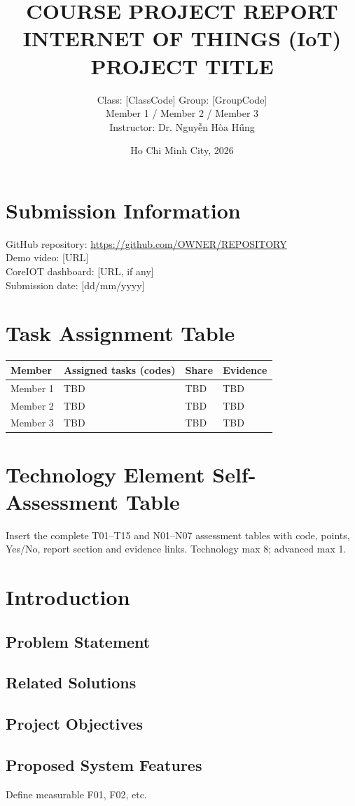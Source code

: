 \documentclass[12pt,a4paper]{report}
\title{COURSE PROJECT REPORT\\INTERNET OF THINGS (IoT)\\[1em]PROJECT TITLE}
\author{Class: [ClassCode] \quad Group: [GroupCode]\\ Member 1 / Member 2 / Member 3\\ Instructor: Dr. Nguy\~{\^e}n H\`oa H\H{u}ng}
\date{Ho Chi Minh City, 2026}
\begin{document}
\maketitle
\chapter*{Submission Information}
GitHub repository: \url{https://github.com/OWNER/REPOSITORY}\\
Demo video: [URL]\\ CoreIOT dashboard: [URL, if any]\\ Submission date: [dd/mm/yyyy]
\chapter*{Task Assignment Table}
\begin{tabular}{llll} Member & Assigned tasks (codes) & Share & Evidence \\ \hline
Member 1 & TBD & TBD & TBD \\ Member 2 & TBD & TBD & TBD \\ Member 3 & TBD & TBD & TBD \\ \end{tabular}
\chapter*{Technology Element Self-Assessment Table}
Insert the complete T01--T15 and N01--N07 assessment tables with code, points, Yes/No, report section and evidence links. Technology max 8; advanced max 1.
\tableofcontents
\chapter{Introduction}
\section{Problem Statement}
\section{Related Solutions}
\section{Project Objectives}
\section{Proposed System Features}
Define measurable F01, F02, etc.
\end{document}
